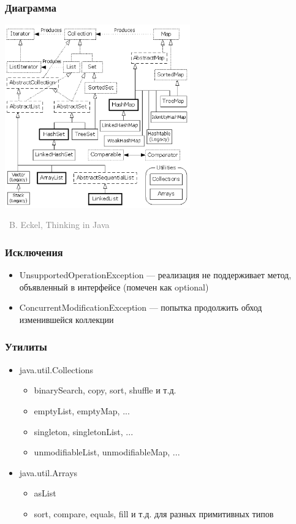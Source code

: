 \documentclass[xetex,mathserif,serif]{beamer}
\newcommand{\attribution}[1] {
\vspace{-5mm}\begin{flushright}\begin{scriptsize}\textcolor{gray}{\textcopyright\, #1}\end{scriptsize}\end{flushright}
}
\begin{document}
	\begin{frame}
		\frametitle{Диаграмма}
		\begin{center}
			\includegraphics[width=0.6\textwidth]{java4Containers.png}
			\attribution{B. Eckel, Thinking in Java}
		\end{center}
	\end{frame}

	\begin{frame}
		\frametitle{Исключения}
		\begin{itemize}
			\item UnsupportedOperationException --- реализация не поддерживает метод, объявленный в интерфейсе (помечен как optional)
			\item ConcurrentModificationException --- попытка продолжить обход изменившейся коллекции
		\end{itemize}
	\end{frame}

	\begin{frame}
		\frametitle{Утилиты}
		\begin{itemize}
			\item java.util.Collections
			\begin{itemize}
				\item binarySearch, copy, sort, shuffle и т.д.
				\item emptyList, emptyMap, ...
				\item singleton, singletonList, ...
				\item unmodifiableList, unmodifiableMap, ...
			\end{itemize}
			\item java.util.Arrays
			\begin{itemize}
				\item asList
				\item sort, compare, equals, fill и т.д. для разных примитивных типов
			\end{itemize}
		\end{itemize}
	\end{frame}
\end{document}
